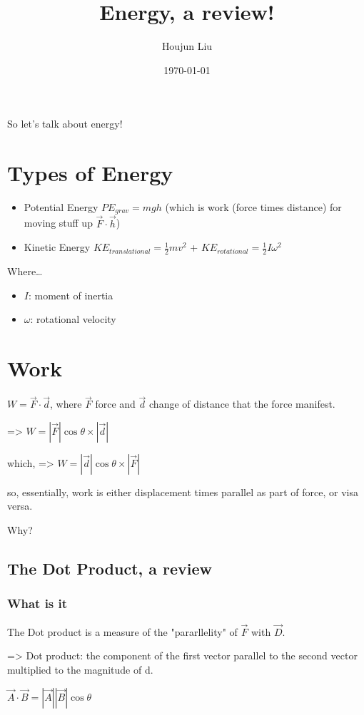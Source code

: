 \documentclass[letterpaper]{article}
\author{Houjun Liu}
\date{\today}
\title{Energy, a review!}
\renewcommand{\tableofcontents}{}
\begin{document}
\tableofcontents

So let's talk about energy!

\section{Types of Energy}
\label{sec:org5574b32}
\begin{itemize}
\item Potential Energy \(PE_{grav}=mgh\) (which is work (force times
distance) for moving stuff up \(\vec{F} \cdot \vec{h}\))
\item Kinetic Energy \(KE_{translational} = \frac{1}{2}mv^2\) +
\(KE_{rotational} = \frac{1}{2}I \omega^2\)
\end{itemize}

Where\ldots{}

\begin{itemize}
\item \(I\): moment of inertia
\item \(\omega\): rotational velocity
\end{itemize}

\section{Work}
\label{sec:orgecb32bf}
\(W = \vec{F} \cdot \vec{d}\), where \(\vec{F}\) force and \(\vec{d}\)
change of distance that the force manifest.

=> \(W = |\vec{F}|\cos{\theta} \times |\vec{d}|\)

which, => \(W = |\vec{d}|\cos{\theta} \times |\vec{F}|\)

so, essentially, work is either displacement times parallel as part of
force, or visa versa.

Why?

\subsection{The Dot Product, a review}
\label{sec:org0b329b5}
\subsubsection{What is it}
\label{sec:orga640268}
The Dot product is a measure of the "pararllelity" of \(\vec{F}\) with
\(\vec{D}\).

=> Dot product: the component of the first vector parallel to the second
vector multiplied to the magnitude of d.

\(\vec{A} \cdot \vec{B} = |\vec{A}||\vec{B}|\cos{\theta}\)
\end{document}
